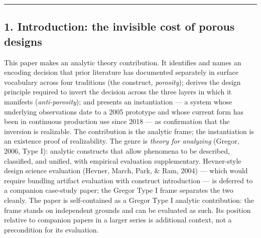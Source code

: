 \documentclass[
]{article}
\begin{document}
\begin{center}\rule{0.5\linewidth}{0.5pt}\end{center}

\subsection{1. Introduction: the invisible cost of porous
designs}\label{introduction-the-invisible-cost-of-porous-designs}

This paper makes an analytic theory contribution. It identifies and
names an encoding decision that prior literature has documented
separately in surface vocabulary across four traditions (the construct,
\emph{porosity}); derives the design principle required to invert the
decision across the three layers in which it manifests
(\emph{anti-porosity}); and presents an instantiation --- a system whose
underlying observations date to a 2005 prototype and whose current form
has been in continuous production use since 2018 --- as confirmation
that the inversion is realizable. The contribution is the analytic
frame; the instantiation is an existence proof of realizability. The
genre is \emph{theory for analyzing} (Gregor, 2006, Type I): analytic
constructs that allow phenomena to be described, classified, and
unified, with empirical evaluation supplementary. Hevner-style design
science evaluation (Hevner, March, Park, \& Ram, 2004) --- which would
require bundling artifact evaluation with construct introduction --- is
deferred to a companion case-study paper; the Gregor Type I frame
separates the two cleanly. The paper is self-contained as a Gregor Type
I analytic contribution: the frame stands on independent grounds and can
be evaluated as such. Its position relative to companion papers in a
larger series is additional context, not a precondition for its
evaluation.
\end{document}
